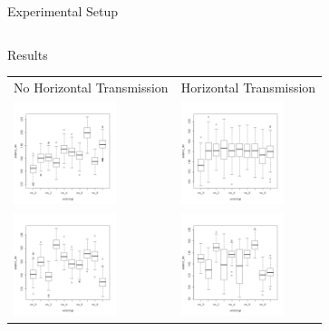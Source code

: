 \documentclass[12pt, notes=show,handout=no]{beamer}
\begin{document}
\begin{frame}{Experimental Setup}
\begin{tabular}{m{5cm}m{5cm}}
    \end{tabular}

\end{frame}

\begin{frame}{Results}

    \begin{center}
	\begin{tabular}{m{3cm}m{3cm}}

	    {\tiny \hspace{.3cm}No Horizontal Transmission} & {\centering\tiny Horizontal Transmission }\\
	    \includegraphics[height=3cm]{images/CNDL.png}
	    &
	    \includegraphics[height=3cm]{images/CYDL.png}

	    \\
	    \includegraphics[height=3cm]{images/CNDS.png}
	    &
	    \includegraphics[height=3cm]{images/CYDS.png}
	    \\

	\end{tabular}

    \end{center}
	
\end{frame}
\end{document}
